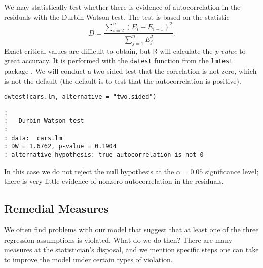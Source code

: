 We may statistically test whether there is evidence of autocorrelation
in the residuals with the Durbin-Watson test. The test is based on the
statistic
\begin{equation}
D=\frac{\sum_{i=2}^{n}(E_{i}-E_{i-1})^{2}}{\sum_{j=1}^{n}E_{j}^{2}}.
\end{equation}
Exact critical values are difficult to obtain, but \(\mathsf{R}\) will
calculate the \emph{p-value} to great accuracy. It is performed with the
\texttt{dwtest} function from the \texttt{lmtest} package \cite{lmtest}. We will
conduct a two sided test that the correlation is not zero, which is
not the default (the default is to test that the autocorrelation is
positive).

\begin{verbatim}
dwtest(cars.lm, alternative = "two.sided")
\end{verbatim}

\begin{verbatim}
: 
: 	Durbin-Watson test
: 
: data:  cars.lm
: DW = 1.6762, p-value = 0.1904
: alternative hypothesis: true autocorrelation is not 0
\end{verbatim}

In this case we do not reject the null hypothesis at the
\(\alpha=0.05\) significance level; there is very little evidence of
nonzero autocorrelation in the residuals.

\subsection{Remedial Measures}
\label{sec-11-4-4}

We often find problems with our model that suggest that at least one
of the three regression assumptions is violated. What do we do then?
There are many measures at the statistician's disposal, and we mention
specific steps one can take to improve the model under certain types
of violation.

